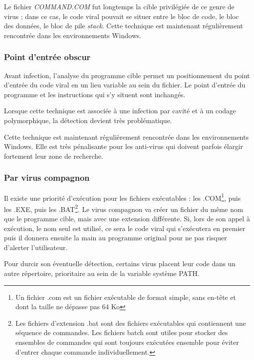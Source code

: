         Le fichier \emph{COMMAND.COM} fut longtemps la cible privilégiée de ce genre de virus ; 
        dans ce cas, le code viral pouvait se situer entre le bloc de code, le bloc des données, le bloc de pile 
        \emph{stack}. Cette technique est maintenant régulièrement rencontrée dans les environnements Windows. %

        \subsubsection{Point d'entrée obscur}
        Avant infection, l'analyse du programme cible permet un positionnement du point d'entrée du code 
        viral en un lieu variable au sein du fichier. Le point d’entrée du programme et les instructions qui 
        s’y situent sont inchangés. \cite{virus_informatique_article}%

        Lorsque cette technique est associée à une infection par cavité et à un codage polymorphique, 
        la détection devient très problématique. %

        Cette technique est maintenant régulièrement rencontrée dans les environnements Windows. 
        Elle est très pénalisante pour les anti-virus qui doivent parfois élargir fortement leur zone de recherche.

        \subsubsection{Par virus compagnon}
        Il existe une priorité d'exécution pour les fichiers exécutables : les .COM\footnote{Un fichier .com est un 
        fichier exécutable de format simple, sans en-tête et dont la taille ne dépasse pas 64 Ko}, puis les .EXE, 
        puis les .BAT\footnote{Les fichiers d'extension .bat sont des fichiers exécutables qui contiennent une 
        séquence de commandes. Les fichiers batch sont utiles pour stocker des ensembles de commandes qui sont 
        toujours exécutées ensemble pour éviter d’entrer chaque commande individuellement.}.
        Le virus compagnon va créer un fichier du même nom que le programme cible, 
        mais avec une extension différente. Si, lors de son appel à exécution, le nom seul est utilisé, 
        ce sera le code viral qui s’exécutera en premier puis il donnera ensuite la main au programme 
        original pour ne pas risquer d’alerter l’utilisateur.\cite{virus_informatique_article} %

        Pour durcir son éventuelle détection, certains virus placent leur code dans un autre répertoire, 
        prioritaire au sein de la variable système PATH. %

